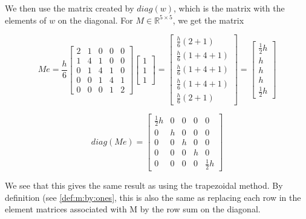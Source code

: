 \documentclass[twoside]{article}
\begin{document}
We then use the matrix created by $diag(w)$, which is the matrix with the elements of $w$ on the diagonal. For $M\in\mathbb{R}^{5\times5}$, we get the matrix

\begin{equation*}
Me =\frac{h}{6}\left[\begin{matrix}
2 & 1 & 0 & 0 & 0\\
1 & 4 & 1 & 0 & 0\\
0 & 1 & 4 & 1 & 0\\
0 & 0 & 1 & 4 & 1\\
0 & 0 & 0 & 1 & 2
\end{matrix}\right]
\left[\begin{matrix}
1 \\
1 \\
1
\end{matrix}\right]
= 
\left[\begin{matrix}
\frac{h}{6}(2 + 1) \\
\frac{h}{6}(1 + 4 + 1) \\
\frac{h}{6}(1 + 4 + 1) \\
\frac{h}{6}(1 + 4 + 1) \\
\frac{h}{6}(2 + 1)
\end{matrix}\right]
=
\left[\begin{matrix}
\frac{1}{2}h \\
h \\
h \\
h \\
\frac{1}{2}h
\end{matrix}\right]
\end{equation*}

\begin{equation*}
diag(Me) =\left[\begin{matrix}
\frac{1}{2} h & 0 & 0 & 0 & 0\\
0 & h & 0 & 0 & 0\\
0 & 0 & h & 0 & 0\\
0 & 0 & 0 & h & 0\\
0 & 0 & 0 & 0 & \frac{1}{2} h
\end{matrix}\right]
\end{equation*}

We see that this gives the same result as using the trapezoidal method. By definition (see \eqref{def:m:by:ones},  this is also the same as replacing each row in the element matrices associated with M by the row sum on the diagonal.
\end{document}

